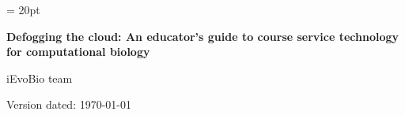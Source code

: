 \documentclass[11pt]{article}
\begin{document}
\renewcommand{\headrulewidth}{0.5pt}
\headsep = 20pt
\lhead{ }

\thispagestyle{plain}
\begin{center}

\textbf{\LARGE Defogging the cloud: An educator's guide to course service technology for computational biology}\\\vspace{2mm}

\vspace{1cm}
{\Large iEvoBio team}
\vspace{1cm}
\end{center}

\def \ResourcePath {./}
\def \GlobalResourcePath {.}


Version dated: \today
\end{document}
